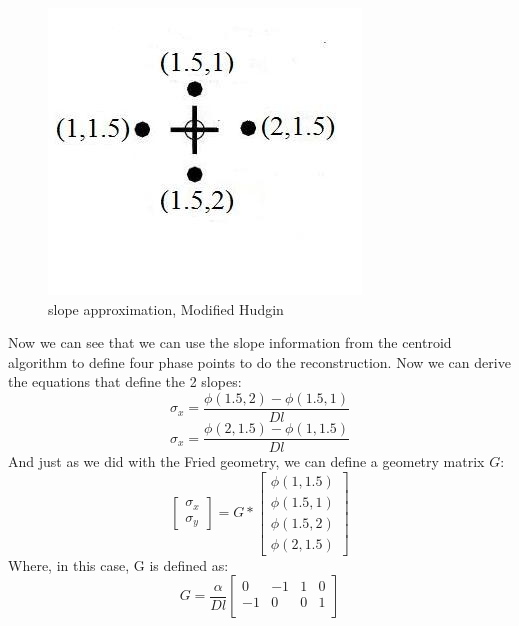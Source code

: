 \documentclass{article}
\begin{document}
\newpage
\begin{figure}[h!]
  \centering
  \includegraphics[scale=0.6]{figures/mod_hudgin}
  \caption{slope approximation, Modified Hudgin}
\end{figure}
\noindent Now we can see that we can use the slope information from the centroid algorithm to define four phase points to do the reconstruction. Now we can derive the equations that define the 2 slopes:
$$ \sigma_x = \frac{\phi(1.5,2)-\phi(1.5,1)}{Dl}$$
$$ \sigma_x = \frac{\phi(2,1.5)-\phi(1,1.5)}{Dl}$$
And just as we did with the Fried geometry, we can define a geometry matrix $G$:
$$ 
\begin{bmatrix}
\sigma_x \\
\sigma_y
\end{bmatrix} 
=
G
*
\begin{bmatrix}
\phi(1,1.5) \\
\phi(1.5,1) \\
\phi(1.5,2) \\
\phi(2,1.5) 
\end{bmatrix}
$$
Where, in this case, G is defined as:
$$
G
=
\frac{\alpha}{Dl}
\begin{bmatrix}
0 & -1 & 1 & 0 \\
-1 & 0 & 0 & 1 \\
\end{bmatrix}
$$
\end{document}

